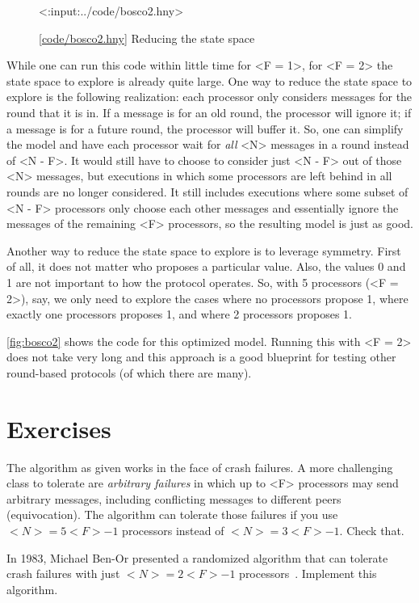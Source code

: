 \documentclass{report}
\newcommand{\harmonylink}[1]{%
[\href{https://harmony.cs.cornell.edu/#1}{\underline{#1}}]%
}
\newenvironment{code}{
\tcolorbox
}{
\endtcolorbox
}
\begin{document}
\begin{figure}
\begin{code}
<{:input:../code/bosco2.hny}>
\end{code}
\caption{\harmonylink{code/bosco2.hny} Reducing the state space}
\label{fig:bosco2}
\end{figure}

While one can run this code within little time for <{F = 1}>, for
<{F = 2}> the state space to explore is already quite large.
One way to reduce the state space to explore is the following realization:
each processor only considers messages for the round that it is in.
If a message is for an old round, the processor will ignore it;
if a message is for a future round, the processor will buffer it.
So, one can simplify the model and have each processor wait
for \emph{all} <{N}> messages in a round
instead of <{N - F}>.
It would still have to choose to consider just <{N - F}>
out of those <{N}> messages, but executions in which some processors
are left behind in all rounds are no longer considered.
It still includes executions where some subset of <{N - F}>
processors only choose each other messages and essentially ignore the
messages of the remaining <{F}> processors, so the resulting model
is just as good.

Another way to reduce the state space to explore is to leverage
symmetry.  First of all, it does not matter who proposes a particular
value.  Also, the values 0 and 1 are not important to how the
protocol operates.  So, with 5 processors (<{F = 2}>), say, we only
need to explore the cases where no processors propose 1, where
exactly one processors proposes 1, and where 2 processors proposes 1.

\autoref{fig:bosco2} shows the code for this optimized model.
Running this with <{F = 2}> does not take very long and this approach
is a good blueprint for testing other round-based protocols (of
which there are many).

\section*{Exercises}
\begin{problems}
\item The algorithm as given works in the face of crash failures.
A more challenging class to tolerate are \emph{arbitrary failures} in
which up to <{F}> processors may send arbitrary messages, including
conflicting messages to different peers (equivocation).
The algorithm can tolerate those failures if you use $<{N}> = 5<{F}> - 1$ processors instead of $<{N}> = 3<{F}> - 1$.  Check that.
\item In 1983, Michael Ben-Or presented a randomized algorithm that can
tolerate crash failures with
just $<{N}> = 2<{F}> - 1$ processors~\cite{BenOr83}.
Implement this algorithm.
\end{problems}
\end{document}
